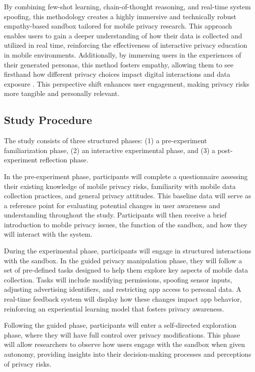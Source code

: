 \documentclass[acmlarge, nonacm]{acmart}
\begin{document}
By combining few-shot learning, chain-of-thought reasoning, and real-time system spoofing, this methodology creates a highly immersive and technically robust empathy-based sandbox tailored for mobile privacy research. This approach enables users to gain a deeper understanding of how their data is collected and utilized in real time, reinforcing the effectiveness of interactive privacy education in mobile environments. Additionally, by immersing users in the experiences of their generated personas, this method fosters empathy, allowing them to see firsthand how different privacy choices impact digital interactions and data exposure \cite{Chaoran2023EmpathySandbox}. This perspective shift enhances user engagement, making privacy risks more tangible and personally relevant.


\subsection{Study Procedure}

The study consists of three structured phases: (1) a pre-experiment familiarization phase, (2) an interactive experimental phase, and (3) a post-experiment reflection phase.

In the pre-experiment phase, participants will complete a questionnaire assessing their existing knowledge of mobile privacy risks, familiarity with mobile data collection practices, and general privacy attitudes. This baseline data will serve as a reference point for evaluating potential changes in user awareness and understanding throughout the study. Participants will then receive a brief introduction to mobile privacy issues, the function of the sandbox, and how they will interact with the system.

During the experimental phase, participants will engage in structured interactions with the sandbox. In the guided privacy manipulation phase, they will follow a set of pre-defined tasks designed to help them explore key aspects of mobile data collection. Tasks will include modifying permissions, spoofing sensor inputs, adjusting advertising identifiers, and restricting app access to personal data. A real-time feedback system will display how these changes impact app behavior, reinforcing an experiential learning model that fosters privacy awareness.

Following the guided phase, participants will enter a self-directed exploration phase, where they will have full control over privacy modifications. This phase will allow researchers to observe how users engage with the sandbox when given autonomy, providing insights into their decision-making processes and perceptions of privacy risks.
\end{document}
